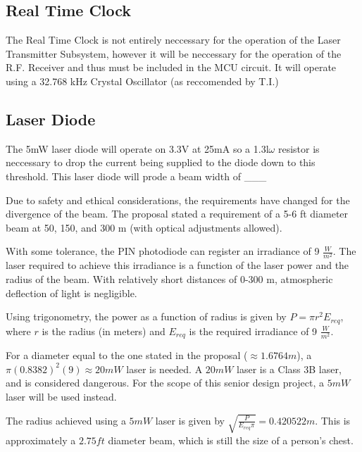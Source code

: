 \documentclass[openbib,letterpaper,10pt]{article}
\begin{document}
\begin{spacing}{1.15}
\subsection*{Real Time Clock}
The Real Time Clock is not entirely neccessary for the operation of the Laser Transmitter Subsystem, however it will be neccessary for the operation of the R.F. Receiver and thus must be included in the MCU circuit. It will operate using a 32.768 kHz Crystal Oscillator (as reccomended by T.I.)

\subsection*{Laser Diode}
The 5mW laser diode will operate on 3.3V at 25mA so a 1.3l$\omega$ resistor is neccessary to drop the current being supplied to the diode down to this threshold. This laser diode will prode a beam width of \_\_\_

Due to safety and ethical considerations, the requirements have changed for the divergence of the beam. The proposal stated a requirement of a 5-6 ft diameter beam at 50, 150, and 300 m (with optical adjustments allowed). 

With some tolerance, the PIN photodiode can register an irradiance of 9 $\frac{W}{m^2}$. The laser required to achieve this irradiance is a function of the laser power and the radius of the beam. With relatively short distances of 0-300 m, atmospheric deflection of light is negligible. 

Using trigonometry, the power as a function of radius is given by $P = \pi r^2  E_{req} $, where $r$ is the radius (in meters) and $E_{req}$ is the required irradiance of 9 $\frac{W}{m^2}$. 

For a diameter equal to the one stated in the proposal ($\approx 1.6764 m$), a $\pi (0.8382)^2(9) \approx 20 mW$ laser is needed. A $20 mW$ laser is a Class 3B laser, and is considered dangerous. For the scope of this senior design project, a $5mW$ laser will be used instead. 

The radius achieved using a $5 mW$ laser is given by $\sqrt{\frac{P}{E_{req} \pi}} = 0.420522 m$. This is approximately a $2.75 ft$ diameter beam, which is still the size of a person's chest. 

\clearpage


\end{spacing}
\end{document}
